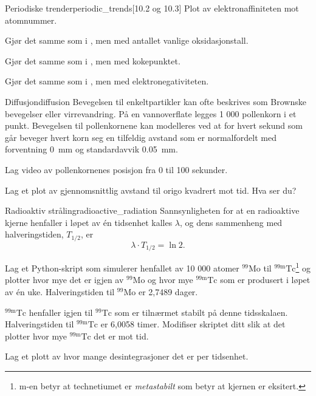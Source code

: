 \begin{exercise}{Periodiske trender}{periodic_trends}[10.2 og 10.3]
	\subexercise Plot av elektronaffiniteten mot atomnummer.
	
	\subexercise Gjør det samme som i , men med antallet vanlige oksidasjonstall.
	
	\subexercise Gjør det samme som i , men med kokepunktet.
	
	\subexercise Gjør det samme som i , men med elektronegativiteten.
\end{exercise}

\begin{exercise}{Diffusjon}{diffusion}
	Bevegelsen til enkeltpartikler kan ofte beskrives som Brownske bevegelser eller virrevandring. På en vannoverflate legges 1 000 pollenkorn i et punkt. Bevegelsen til pollenkornene kan modelleres ved at for hvert sekund som går beveger hvert korn seg en tilfeldig avstand som er normalfordelt med forventning \SI{0}{\milli\meter} og standardavvik \SI{0.05}{\milli\meter}. 
	
	\subexercise Lag video av pollenkornenes posisjon fra 0 til 100 sekunder.
	
	\subexercise Lag et plot av gjennomsnittlig avstand til origo kvadrert mot tid. Hva ser du?
\end{exercise}

\exercisechapter

\begin{exercise}{Radioaktiv stråling}{radioactive_radiation}
	Sannsynligheten for at en radioaktive kjerne henfaller i løpet av én tidsenhet kalles $\lambda$, og dens sammenheng med halveringstiden, $T_{1/2}$, er
	\begin{equation*}
	\lambda \cdot T_{1/2} = \ln 2.
	\end{equation*}
	
	\subexercise Lag et Python-skript som simulerer henfallet av 10 000 atomer ${}^{99}\mathrm{Mo}$ til ${}^{99\mathrm{m}}\mathrm{Tc}$\footnote{m-en betyr at technetiumet er \emph{metastabilt} som betyr at kjernen er eksitert.} og plotter hvor mye det er igjen av ${}^{99}\mathrm{Mo}$ og hvor mye ${}^{99\mathrm{m}}\mathrm{Tc}$ som er produsert i løpet av én uke. Halveringstiden til ${}^{99}\mathrm{Mo}$ er 2,7489 dager.
	
	\subexercise ${}^{99\mathrm{m}}\mathrm{Tc}$ henfaller igjen til ${}^{99}\mathrm{Tc}$ som er tilnærmet stabilt på denne tidsskalaen. Halveringstiden til ${}^{99\mathrm{m}}\mathrm{Tc}$ er 6,0058 timer. Modifiser skriptet ditt slik at det plotter hvor mye ${}^{99\mathrm{m}}\mathrm{Tc}$ det er mot tid.
	
	\subexercise Lag et plott av hvor mange desintegrasjoner det er per tidsenhet.
\end{exercise}

